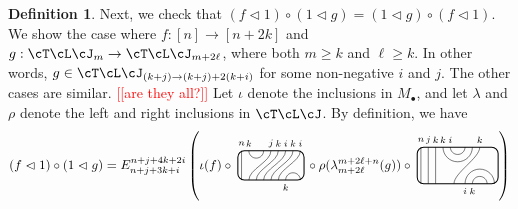 \documentclass[11pt]{article}
\theoremstyle{plain}
\theoremstyle{definition}
\newtheorem{defn}[thm]{Definition}
\newcommand{\nn}[1]{\textcolor{red}{[[#1]]}}
\newcommand{\TLJ}{\cT\cL\cJ}
\newcommand{\TLPlusPIso}[3]{
	\TLTStart
	\TLTThrough{#1}
	\TLTSnakeR{#2}{#3}
	\TLTEnd
}
\newcommand{\TLTCalcLabelOffset}[3][0cm]{
	\settowidth{#2}{\scriptsize{$#3$}}
	\setlength{#2}{.5#2}
	\setlength{#2}{\maxof{#2}{#1}}
}
\newcommand{\TLTEnd}{
	\draw[thick, rounded corners = 5pt] (0,0) rectangle ($ (TLTlead) + (0,.8) $);
 \end{tikzpicture}
}
\newcommand{\TLTStart}{
 \begin{tikzpicture}[baseline=.3cm]
	\coordinate (TLTlead) at (.2,0); %
	\let\TLTlabelwidth\relax
	\newlength{\TLTlabelwidth}
}
\newcommand{\TLTThrough}[1]{
	\TLTCalcLabelOffset[.2cm]{\TLTlabelwidth}{#1}
	\coordinate (TLTlead) at ($ (TLTlead) + ({\TLTlabelwidth},0) $);
	\begin{scope}[shift=(TLTlead)]
		\draw (0,0) -- (0,.8);
		\node at (0,1) {\scriptsize{$#1$}};
	\end{scope}
		\coordinate (TLTlead) at ($ (TLTlead) + ({\TLTlabelwidth},0) $);
}
\newcommand{\TLTSnakeR}[2]{
	\let\TLTscwidth\relax
	\newlength{\TLTscwidth}
	\let\TLTsswidth\relax
	\newlength{\TLTsswidth}
	\TLTCalcLabelOffset[.2cm]{\TLTscwidth}{#1}
	\TLTCalcLabelOffset[.5cm]{\TLTsswidth}{#2}
	\setlength{\TLTlabelwidth}{\TLTscwidth+\TLTsswidth}
	\setlength{\TLTlabelwidth}{\maxof{\TLTlabelwidth}{.7cm}} %
	\coordinate (TLTlead) at ($ (TLTlead) + ({\TLTscwidth},0) $);
	\begin{scope}[shift=(TLTlead)]
		\draw (.1,.8) arc (-180:0:.2cm);
		\draw (.1,0) .. controls ++(90:.3cm) and ++(270:.3cm) .. ($ (.1,.8) + ({\TLTlabelwidth},0) $);
		\draw ($ (.1,0) + ({\TLTsswidth},0) $) arc (180:0:.2cm);
		\node at (.1,1) {\scriptsize{$#1$}};
		\node at ($ (.1,1) + ({\TLTlabelwidth},0) $) {\scriptsize{$#2$}};
		\node at ($ (.1,-.2) + ({\TLTsswidth},0) $) {\scriptsize{$#1$}};
	\end{scope}
	\coordinate (TLTlead) at ($ (TLTlead) + ({\TLTlabelwidth+\TLTsswidth},0) $);
}
\begin{document}
\begin{defn}
	
	Next, we check that $(f\vartriangleleft1)\circ(1\vartriangleleft g)=(1\vartriangleleft g)\circ(f\vartriangleleft1)$. 
	We show the case where $f:[n]\to[n+2k]$ and $g:\TLJ_m\to\TLJ_{m+2\ell}$, where both $m\ge k$ and $\ell\ge k$. In other words, $g\in\TLJ_{(k+j)\to(k+j)+2(k+i)}$ for some non-negative $i$ and $j$. The other cases are similar. \nn{are they all?}
	Let $\iota$ denote the inclusions in $M_\bullet$, and let $\lambda$ and $\rho$ denote the left and right inclusions in $\TLJ$. 
	By definition, we have 
	\begin{align*}
		(f\vartriangleleft 1)\circ(1\vartriangleleft g) &= E^{n+j+4k+2i}_{n+j+3k+i}\left(\iota(f)\circ
  \begin{tikzpicture}[baseline=.3cm]
			\draw (.1,0) -- (.1,.8);
		 \draw (.3,.8) arc (-180:0:.2cm);
			\draw (.3,0)  .. controls ++(90:.3cm) and ++(270:.3cm) .. (.9,.8);
			\draw (.5,0)  .. controls ++(90:.3cm) and ++(270:.3cm) .. (1.1,.8);
			\draw (.7,0)  .. controls ++(90:.3cm) and ++(270:.3cm) .. (1.3,.8);
			\draw (.9,0)  .. controls ++(90:.3cm) and ++(270:.3cm) .. (1.5,.8);
			\draw (1.1,0)  .. controls ++(90:.3cm) and ++(270:.3cm) .. (1.7,.8);
		 \draw (1.3,0) arc (180:0:.2cm);
			\node at (.1,1) {\scriptsize{$n$}};
		 \node at (.3,1) {\scriptsize{$k$}};
			\node at (.9,1) {\scriptsize{$j$}};
			\node at (1.1,1) {\scriptsize{$k$}};
			\node at (1.3,1) {\scriptsize{$i$}};
			\node at (1.5,1) {\scriptsize{$k$}};
			\node at (1.7,1) {\scriptsize{$i$}};
		 \node at (1.3,-.2) {\scriptsize{$k$}};
			\draw[thick, rounded corners = 5pt] (0,0) rectangle (1.8,.8);
		\end{tikzpicture}
		\circ \rho(\lambda_{m+2\ell}^{m+2\ell+n}(g))\circ
		\begin{tikzpicture}[baseline=.4cm]
			\draw (.1,0) -- (.1,1);
			\node at (.1,1.2) {\scriptsize{$n$}};
			\draw (.3,0) -- (.3,1);
			\node at (.3,1.2) {\scriptsize{$j$}};
			\draw (.5,0) -- (.5,1);
			\node at (.5,1.2) {\scriptsize{$k$}};
			\draw (.7,1) arc (-180:0:.4cm);
			\node at (.7,1.2) {\scriptsize{$k$}};
			\draw (.9,1) arc (-180:0:.2cm);
			\node at (.9,1.2) {\scriptsize{$i$}};
			\draw (1,0)  .. controls ++(90:.3cm) and ++(270:.3cm) .. (1.7,1);
			\node at (1.7,1.2) {\scriptsize{$k$}};
			\draw (1.3,0) arc (180:0:.4cm);
			\node at (1.3,-.2) {\scriptsize{$i$}};
			\draw (1.5,0) arc (180:0:.2cm);
			\node at (1.5,-.2) {\scriptsize{$k$}};
			\draw[thick, rounded corners = 5pt] (0,0) rectangle (2.2,1);
		\end{tikzpicture}
		\right)\\

\end{align*}
\end{defn}
\end{document}
